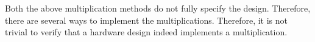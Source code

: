Both the above multiplication methods do not
fully specify the design.
%
Therefore, there are several ways to implement the multiplications.
%
Therefore, it is not trivial to verify that a hardware design indeed
implements a multiplication.



